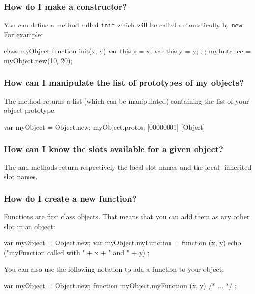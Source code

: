 \subsubsection{How do I make a constructor?}
You can define a method called \lstinline{init} which will be called
automatically by \lstinline{new}. For example:

\begin{urbiunchecked}
class myObject
{
  function init(x, y)
  {
    var this.x = x;
    var this.y = y;
  };
};
myInstance = myObject.new(10, 20);
\end{urbiunchecked}


\subsubsection{How can I manipulate the list of prototypes of my objects?}
The  method returns a list (which can be manipulated)
containing the list of your object prototype.

\begin{urbiunchecked}
var myObject = Object.new;
myObject.protos;
[00000001] [Object]
\end{urbiunchecked}

\subsubsection{How can I know the slots available for a given object?}
The  and  methods
return respectively the local slot names and the local+inherited slot
names.

\subsubsection{How do I create a new function?}
Functions are first class objects. That means that you can add them as
any other slot in an object:

\begin{urbiunchecked}
var myObject = Object.new;
var myObject.myFunction = function (x, y)
  { echo ("myFunction called with " + x + " and " + y) };
\end{urbiunchecked}

You can also use the following notation to add a function to your
object:

\begin{urbiunchecked}
var myObject = Object.new;
function myObject.myFunction (x, y) { /* ... */ };
\end{urbiunchecked}

